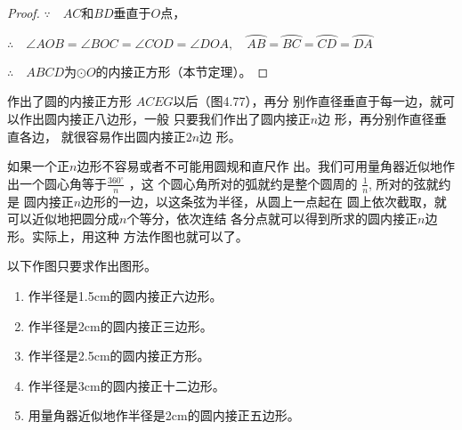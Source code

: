 \begin{proof}
 $\because\quad AC$和$BD$垂直于$O$点，

$\therefore\quad \angle AOB=\angle BOC=\angle COD=\angle DOA,\quad 
  \wideparen{AB}=\wideparen{BC}=\wideparen{CD}=\wideparen{DA}$

  $\therefore\quad ABCD$为$\odot O$的内接正方形（本节定理）。
\end{proof}

\begin{figure}[htp]\centering
  \begin{minipage}[t]{0.48\textwidth}
  \centering
{}
  \caption{}
  \end{minipage}
  \begin{minipage}[t]{0.48\textwidth}
  \centering
  \caption{}
  \end{minipage}
  \end{figure}

  作出了圆的内接正方形
  $ACEG$以后（图4.77），再分
  别作直径垂直于每一边，就可
  以作出圆内接正八边形，一般
  只要我们作出了圆内接正$n$边
  形，再分别作直径垂直各边，
  就很容易作出圆内接正$2n$边
  形。

  如果一个正$n$边形不容易或者不可能用圆规和直尺作
  出。我们可用量角器近似地作出一个圆心角等于$\frac{360^{\circ}}{n}$
  ，这
  个圆心角所对的弧就约是整个圆周的
  $\frac{1}{n}$, 所对的弦就约是
  圆内接正$n$边形的一边，以这条弦为半径，从圆上一点起在
  圆上依次截取，就可以近似地把圆分成$n$个等分，依次连结
  各分点就可以得到所求的圆内接正$n$边形。实际上，用这种
  方法作图也就可以了。

\begin{ex}
  以下作图只要求作出图形。
  \begin{enumerate}
    \item 作半径是1.5cm的圆内接正六边形。
    \item 作半径是2cm的圆内接正三边形。
    \item 作半径是2.5cm的圆内接正方形。
    \item 作半径是3cm的圆内接正十二边形。
    \item 用量角器近似地作半径是2cm的圆内接正五边形。
  \end{enumerate}
\end{ex}

